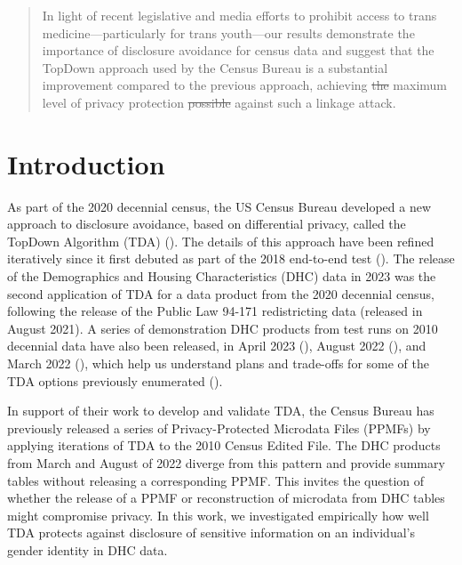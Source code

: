 \documentclass{jpc} %
\theoremstyle{plain}\newtheorem{satz}[thm]{Satz} %
\providecommand{\DIFaddtex}[1]{{\protect\color{blue}\uwave{#1}}} %
\providecommand{\DIFdeltex}[1]{{\protect\color{red}\sout{#1}}}                      %
\providecommand{\DIFaddbegin}{} %
\providecommand{\DIFaddend}{} %
\providecommand{\DIFdelbegin}{} %
\providecommand{\DIFdelend}{} %
\providecommand{\DIFadd}[1]{\texorpdfstring{\DIFaddtex{#1}}{#1}} %
\providecommand{\DIFdel}[1]{\texorpdfstring{\DIFdeltex{#1}}{}} %
\begin{document}
\begin{abstract}
  In light of recent legislative and media efforts to prohibit access to trans medicine---particularly for trans youth---our results demonstrate the importance of disclosure avoidance for census data and suggest that the TopDown approach used by the Census Bureau is a substantial improvement compared to the previous approach, achieving \DIFdelbegin \DIFdel{the }\DIFdelend \DIFaddbegin \DIFadd{a baseline }\DIFaddend maximum level of privacy protection \DIFdelbegin \DIFdel{possible }\DIFdelend against such a linkage attack.
\end{abstract}

\maketitle

\section*{Introduction}\label{S:one}

As part of the 2020 decennial census, the US Census Bureau developed a new approach to disclosure avoidance, based on differential privacy, called the TopDown Algorithm (TDA) (\cite{Abowd20222020}).  The details of this approach have been refined iteratively since it first debuted as part of the 2018 end-to-end test (\cite{garfinkel2019end}).  The release of the Demographics and Housing Characteristics (DHC) data in 2023 was the second application of TDA for a data product from the 2020 decennial census, following the release of the Public Law 94-171 redistricting data (released in August 2021).  A series of  demonstration DHC products from test runs on 2010 decennial data have also been released, in April 2023 (\cite{census2023demonstration}), August 2022 (\cite{census2022bdemonstration}), and March 2022 (\cite{census2022demonstration}), which help us understand plans and trade-offs for some of the TDA options previously enumerated  (\cite{petti2019differential}).

In support of their work to develop and validate TDA,  the Census Bureau has previously released a series of Privacy-Protected Microdata Files (PPMFs) by applying iterations of TDA to the 2010 Census Edited File.  The DHC products from March and August of 2022 diverge from this pattern and provide summary tables without releasing a corresponding PPMF.  This invites the question of whether the release of a PPMF or reconstruction of microdata from DHC tables might compromise privacy.  In this work, we investigated empirically how well TDA protects against disclosure of sensitive information on an individual's gender identity in DHC data.
\end{document}
